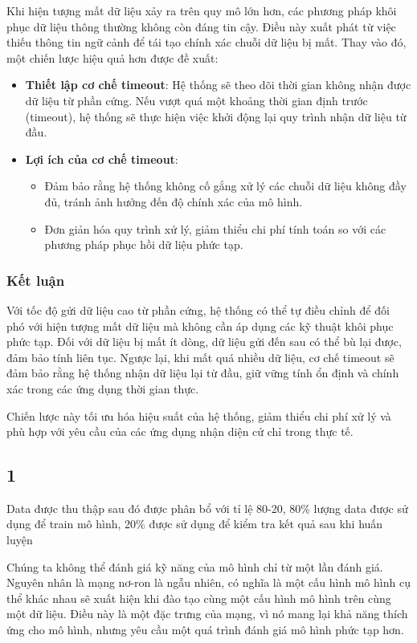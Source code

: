 Khi hiện tượng mất dữ liệu xảy ra trên quy mô lớn hơn, các phương pháp khôi phục dữ liệu thông thường không còn đáng tin cậy. Điều này xuất phát từ việc thiếu thông tin ngữ cảnh để tái tạo chính xác chuỗi dữ liệu bị mất. Thay vào đó, một chiến lược hiệu quả hơn được đề xuất:
\begin{itemize}
    \item \textbf{Thiết lập cơ chế timeout}: Hệ thống sẽ theo dõi thời gian không nhận được dữ liệu từ phần cứng. Nếu vượt quá một khoảng thời gian định trước (timeout), hệ thống sẽ thực hiện việc khởi động lại quy trình nhận dữ liệu từ đầu.
    \item \textbf{Lợi ích của cơ chế timeout}:
    \begin{itemize}
        \item Đảm bảo rằng hệ thống không cố gắng xử lý các chuỗi dữ liệu không đầy đủ, tránh ảnh hưởng đến độ chính xác của mô hình.
        \item Đơn giản hóa quy trình xử lý, giảm thiểu chi phí tính toán so với các phương pháp phục hồi dữ liệu phức tạp.
    \end{itemize}
\end{itemize}

\subsubsection{Kết luận}

Với tốc độ gửi dữ liệu cao từ phần cứng, hệ thống có thể tự điều chỉnh để đối phó với hiện tượng mất dữ liệu mà không cần áp dụng các kỹ thuật khôi phục phức tạp. Đối với dữ liệu bị mất ít dòng, dữ liệu gửi đến sau có thể bù lại được, đảm bảo tính liên tục. Ngược lại, khi mất quá nhiều dữ liệu, cơ chế timeout sẽ đảm bảo rằng hệ thống nhận dữ liệu lại từ đầu, giữ vững tính ổn định và chính xác trong các ứng dụng thời gian thực.

Chiến lược này tối ưu hóa hiệu suất của hệ thống, giảm thiểu chi phí xử lý và phù hợp với yêu cầu của các ứng dụng nhận diện cử chỉ trong thực tế.




\subsection{1}
Data được thu thập sau đó được phân bổ với tỉ lệ 80-20, 80\% lượng data được sử dụng để train mô hình, 20\% được sử dụng để kiểm tra kết quả sau khi huấn luyện

Chúng ta không thể đánh giá kỹ năng của mô hình chỉ từ một lần đánh giá.
Nguyên nhân là mạng nơ-ron là ngẫu nhiên, có nghĩa là một cấu hình mô hình cụ thể khác nhau sẽ xuất hiện khi đào tạo cùng một cấu hình mô hình trên cùng một dữ liệu. Điều này là một đặc trưng của mạng, vì nó mang lại khả năng thích ứng cho mô hình, nhưng yêu cầu một quá trình đánh giá mô hình phức tạp hơn.

